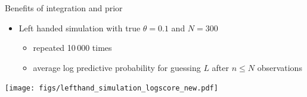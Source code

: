 \documentclass[english,t]{beamer}
\begin{document}

  


\begin{frame}{Benefits of integration and prior}

  \begin{itemize}
  \item Left handed simulation with true $\theta=0.1$ and $N=300$
    \begin{itemize}
    \item repeated 10\,000 times
    \item average log predictive probability for guessing $L$ after $n \leq N$ observations
    \end{itemize}
  \end{itemize}
  
  \hspace{-1cm}\texttt{[image: figs/lefthand\_simulation\_logscore\_new.pdf]}

\end{frame}


\end{document}
